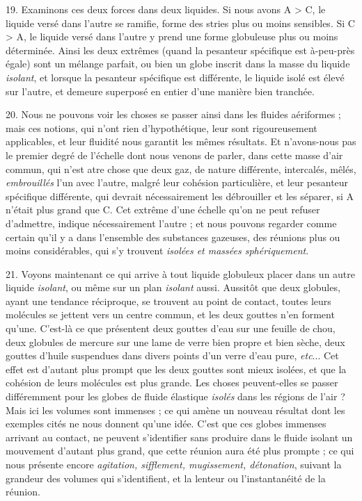 \documentclass[a4paper, 11pt, oneside, polutonikogreek, french]{article}
\begin{document}
19. Examinons ces deux forces dans deux liquides. Si nous avons A > C, le liquide versé dans l'autre se ramifie, forme des stries plus ou moins sensibles. Si C > A, le liquide versé dans l'autre y prend une forme globuleuse plus ou moins déterminée. Ainsi les deux extrêmes (quand la pesanteur spécifique est à-peu-près égale) sont un mélange parfait, ou bien un globe inscrit dans la masse du liquide \emph{isolant}, et lorsque la pesanteur spécifique est différente, le liquide isolé est élevé sur l'autre, et demeure superposé en entier d'une manière bien tranchée.

20. Nous ne pouvons voir les choses se passer ainsi dans les fluides aériformes ; mais ces notions, qui n'ont rien d'hypothétique, leur sont rigoureusement applicables, et leur fluidité nous garantit les mêmes résultats. Et n'avons-nous pas le premier degré de l'échelle dont nous venons de parler, dans cette masse d'air commun, qui n'est atre chose que deux gaz, de nature différente, intercalés, mêlés, \emph{embrouillés} l'un avec l'autre, malgré leur cohésion particulière, et leur pesanteur spécifique différente, qui devrait nécessairement les débrouiller et les séparer, si A n'était plus grand que C. Cet extrême d'une échelle qu'on ne peut refuser d'admettre, indique nécessairement l'autre ; et nous pouvons regarder comme certain qu'il y a dans l'ensemble des substances gazeuses, des réunions plus ou moins considérables, qui s'y trouvent \emph{isolées et massées sphériquement}.

21. Voyons maintenant ce qui arrive à tout liquide globuleux placer dans un autre liquide \emph{isolant}, ou même sur un plan \emph{isolant} aussi. Aussitôt que deux globules, ayant une tendance réciproque, se trouvent au point de contact, toutes leurs molécules se jettent vers un centre commun, et les deux gouttes n'en forment qu'une. C'est-là ce que présentent deux gouttes d'eau sur une feuille de chou, deux globules de mercure sur une lame de verre bien propre et bien sèche, deux gouttes d'huile suspendues dans divers points d'un verre d'eau pure, \emph{etc}... Cet effet est d'autant plus prompt que les deux gouttes sont mieux isolées, et que la cohésion de leurs molécules est plus grande. Les choses peuvent-elles se passer différemment pour les globes de fluide élastique \emph{isolés} dans les régions de l'air ? Mais ici les volumes sont immenses ; ce qui amène un nouveau résultat dont les exemples cités ne nous donnent qu'une idée. C'est que ces globes immenses arrivant au contact, ne peuvent s'identifier sans produire dans le fluide isolant un mouvement d'autant plus grand, que cette réunion aura été plus prompte ; ce qui nous présente encore \emph{agitation, sifflement, mugissement, détonation}, suivant la grandeur des volumes qui s'identifient, et la lenteur ou l'instantanéité de la réunion.
\end{document}
